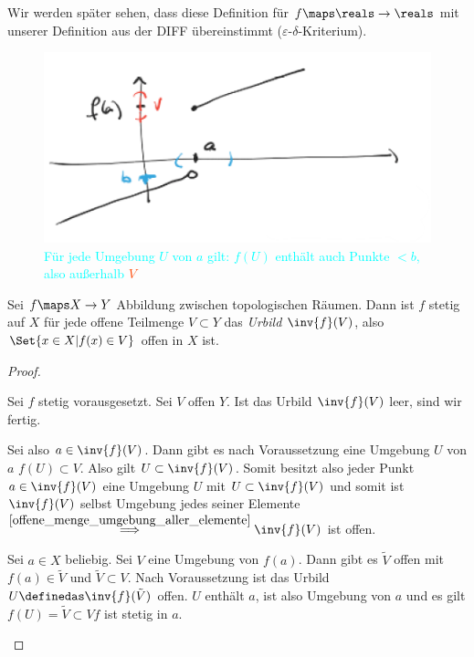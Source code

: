 \begin{bemerkung*}
    Wir werden später sehen, dass diese Definition für \( f\maps \reals\to\reals \) mit unserer Definition aus der DIFF  übereinstimmt (\( \varepsilon \)-\( \delta \)-Kriterium).
\end{bemerkung*}
\begin{figure}[H]
    \centering
    \includegraphics[width=0.6\linewidth]{figures/topologische_unstetigkeit_beispiel_aus_r}
    \caption*{\textcolor{Cyan}{Für jede Umgebung \( U \) von \( a \) gilt: \( f(U) \) enthält auch Punkte \( <b \), also außerhalb }\textcolor{OrangeRed}{\( V \)}}
    \label{fig:topologische_unstetigkeit_beispiel_aus_r}
\end{figure}
\begin{satz}
    Sei \( f\maps X\to Y \) Abbildung zwischen topologischen Räumen. 
    Dann ist \( f \) stetig auf \( X \) \gdw für jede offene Teilmenge \( V\subset Y \) das \emph{Urbild} \( \inv{f}(V) \), also \( \Set{x\in X|f(x)\in V} \) offen in \( X \) ist.
\end{satz}
\begin{proof}
    \begin{proofdescription}
        
        \item[\hin] Sei \( f \) stetig vorausgesetzt.
        Sei \( V \) offen \( Y \). Ist das Urbild \( \inv{f}(V) \) leer, sind wir fertig.
        
        Sei also \( a\in \inv{f}(V) \). 
        Dann gibt es nach Voraussetzung eine Umgebung \( U \) von \( a \) \sd \( f(U)\subset V \). 
        Also gilt \( U \subset \inv{f}(V)\). 
        Somit besitzt also jeder Punkt \( a\in \inv{f}(V) \) eine Umgebung \( U \) mit \( U\subset \inv{f}(V) \) und somit ist \( \inv{f}(V) \) selbst Umgebung jedes seiner Elemente \( \overset{\ref{offene_menge_umgebung_aller_elemente}}{\implies} \inv{f}(V)\) ist offen.

        
        \item[\rueck] Sei \( a\in X \) beliebig. Sei \( V \) eine Umgebung von \( f(a) \). Dann gibt es \( \tilde{V} \) offen mit \( f(a)\in \tilde{V} \) und \( \tilde{V}\subset V \). Nach Voraussetzung ist das Urbild \( U\definedas \inv{f}(\tilde{V}) \) offen. \( U \) enthält \( a \), ist also Umgebung von \( a \) und es gilt \( f(U)=\tilde{V}\subset V \)\timplies \( f \) ist stetig in \( a \).
    \end{proofdescription}
    
\end{proof}
